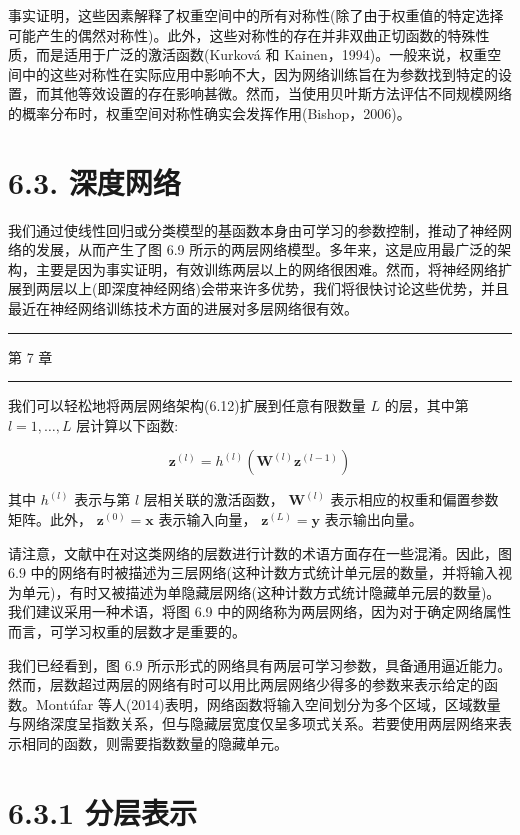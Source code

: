 \documentclass[10pt]{article}
\newcommand{\HRule}{\begin{center}\rule{0.9\linewidth}{0.2mm}\end{center}}
\begin{document}
事实证明，这些因素解释了权重空间中的所有对称性(除了由于权重值的特定选择可能产生的偶然对称性)。此外，这些对称性的存在并非双曲正切函数的特殊性质，而是适用于广泛的激活函数(Kurková 和 Kainen，1994)。一般来说，权重空间中的这些对称性在实际应用中影响不大，因为网络训练旨在为参数找到特定的设置，而其他等效设置的存在影响甚微。然而，当使用贝叶斯方法评估不同规模网络的概率分布时，权重空间对称性确实会发挥作用(Bishop，2006)。

\section*{6.3. 深度网络}

我们通过使线性回归或分类模型的基函数本身由可学习的参数控制，推动了神经网络的发展，从而产生了图 6.9 所示的两层网络模型。多年来，这是应用最广泛的架构，主要是因为事实证明，有效训练两层以上的网络很困难。然而，将神经网络扩展到两层以上(即深度神经网络)会带来许多优势，我们将很快讨论这些优势，并且最近在神经网络训练技术方面的进展对多层网络很有效。

\HRule

第 7 章

\HRule

我们可以轻松地将两层网络架构(6.12)扩展到任意有限数量 \(L\) 的层，其中第 \(l = 1,\ldots ,L\) 层计算以下函数:

\[
{\mathbf{z}}^{\left( l\right) } = {h}^{\left( l\right) }\left( {{\mathbf{W}}^{\left( l\right) }{\mathbf{z}}^{\left( l - 1\right) }}\right)  \tag{6.19}
\]

其中 \({h}^{\left( l\right) }\) 表示与第 \(l\) 层相关联的激活函数， \({\mathbf{W}}^{\left( l\right) }\) 表示相应的权重和偏置参数矩阵。此外， \({\mathbf{z}}^{\left( 0\right) } = \mathbf{x}\) 表示输入向量， \({\mathbf{z}}^{\left( L\right) } = \mathbf{y}\) 表示输出向量。

请注意，文献中在对这类网络的层数进行计数的术语方面存在一些混淆。因此，图 6.9 中的网络有时被描述为三层网络(这种计数方式统计单元层的数量，并将输入视为单元)，有时又被描述为单隐藏层网络(这种计数方式统计隐藏单元层的数量)。我们建议采用一种术语，将图 6.9 中的网络称为两层网络，因为对于确定网络属性而言，可学习权重的层数才是重要的。

我们已经看到，图 6.9 所示形式的网络具有两层可学习参数，具备通用逼近能力。然而，层数超过两层的网络有时可以用比两层网络少得多的参数来表示给定的函数。Montúfar 等人(2014)表明，网络函数将输入空间划分为多个区域，区域数量与网络深度呈指数关系，但与隐藏层宽度仅呈多项式关系。若要使用两层网络来表示相同的函数，则需要指数数量的隐藏单元。

\section*{6.3.1 分层表示}
\end{document}
